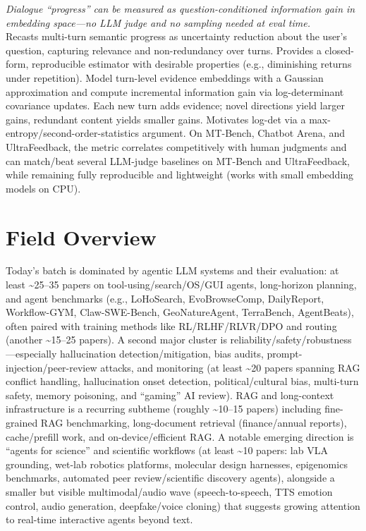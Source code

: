 \documentclass[12pt,letterpaper]{article}
\begin{document}
{\small\textit{Dialogue ``progress'' can be measured as question-conditioned information gain in embedding space---no LLM judge and no sampling needed at eval time.}}\\[1pt]
{\footnotesize Recasts multi-turn semantic progress as uncertainty reduction about the user's question, capturing relevance and non-redundancy over turns. Provides a closed-form, reproducible estimator with desirable properties (e.g., diminishing returns under repetition). Model turn-level evidence embeddings with a Gaussian approximation and compute incremental information gain via log-determinant covariance updates. Each new turn adds evidence; novel directions yield larger gains, redundant content yields smaller gains. Motivates log-det via a max-entropy/second-order-statistics argument. On MT-Bench, Chatbot Arena, and UltraFeedback, the metric correlates competitively with human judgments and can match/beat several LLM-judge baselines on MT-Bench and UltraFeedback, while remaining fully reproducible and lightweight (works with small embedding models on CPU).}

\medskip



\section*{Field Overview}
{\footnotesize Today's batch is dominated by agentic LLM systems and their evaluation: at least \textasciitilde{}25--35 papers on tool-using/search/OS/GUI agents, long-horizon planning, and agent benchmarks (e.g., LoHoSearch, EvoBrowseComp, DailyReport, Workflow-GYM, Claw-SWE-Bench, GeoNatureAgent, TerraBench, AgentBeats), often paired with training methods like RL/RLHF/RLVR/DPO and routing (another \textasciitilde{}15--25 papers). A second major cluster is reliability/safety/robustness---especially hallucination detection/mitigation, bias audits, prompt-injection/peer-review attacks, and monitoring (at least \textasciitilde{}20 papers spanning RAG conflict handling, hallucination onset detection, political/cultural bias, multi-turn safety, memory poisoning, and ``gaming'' AI review). RAG and long-context infrastructure is a recurring subtheme (roughly \textasciitilde{}10--15 papers) including fine-grained RAG benchmarking, long-document retrieval (finance/annual reports), cache/prefill work, and on-device/efficient RAG. A notable emerging direction is ``agents for science'' and scientific workflows (at least \textasciitilde{}10 papers: lab VLA grounding, wet-lab robotics platforms, molecular design harnesses, epigenomics benchmarks, automated peer review/scientific discovery agents), alongside a smaller but visible multimodal/audio wave (speech-to-speech, TTS emotion control, audio generation, deepfake/voice cloning) that suggests growing attention to real-time interactive agents beyond text.}
\end{document}
